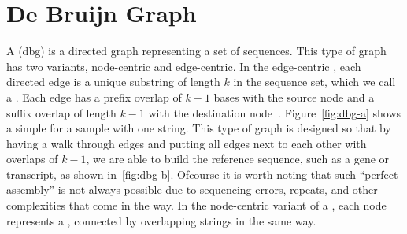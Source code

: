 \section{De Bruijn Graph}
\label{subsec:dbg}
A \dbg (dbg) is a directed graph representing a set of sequences.
This type of graph has two variants, node-centric and edge-centric.
In the edge-centric \dbg, each directed edge is a unique substring of length $k$ in the sequence set,
which we call a \kmer. Each edge has a prefix overlap of $k-1$ bases with the source node
and a suffix overlap of length $k-1$ with the destination node~\cite{paten2017genome}.
Figure~\ref{fig:dbg-a} shows a simple \dbg for a sample with one string.
This type of graph is designed so that by having a walk through edges and
putting all edges next to each other with overlaps of $k-1$,
we are able to build the reference sequence, such as a gene or transcript,
as shown in~\ref{fig:dbg-b}. Ofcourse it is worth noting that such ``perfect assembly''
is not always possible due to sequencing errors, repeats, and other complexities that come in the way.
In the node-centric variant of a \dbg, each node represents a \kmer,
connected by overlapping strings in the same way.

